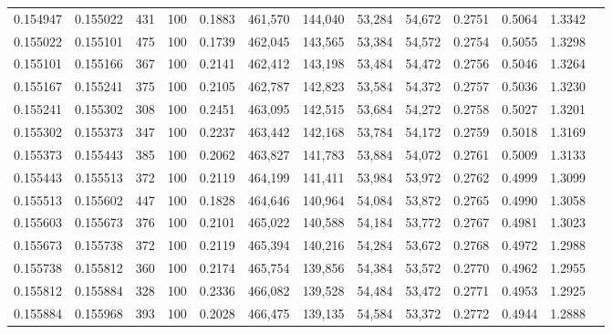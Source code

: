 \begin{tabular}{rrrrrrrrrrrrr}
0.154947 & 0.155022 &   431 & 100 &                                     0.1883 & 461,570 & 144,040 &  53,284 &  54,672 & 0.2751 & 0.5064 & 1.3342 \\
0.155022 & 0.155101 &   475 & 100 &                                     0.1739 & 462,045 & 143,565 &  53,384 &  54,572 & 0.2754 & 0.5055 & 1.3298 \\
0.155101 & 0.155166 &   367 & 100 &                                     0.2141 & 462,412 & 143,198 &  53,484 &  54,472 & 0.2756 & 0.5046 & 1.3264 \\
0.155167 & 0.155241 &   375 & 100 &                                     0.2105 & 462,787 & 142,823 &  53,584 &  54,372 & 0.2757 & 0.5036 & 1.3230 \\
0.155241 & 0.155302 &   308 & 100 &                                     0.2451 & 463,095 & 142,515 &  53,684 &  54,272 & 0.2758 & 0.5027 & 1.3201 \\
0.155302 & 0.155373 &   347 & 100 &                                     0.2237 & 463,442 & 142,168 &  53,784 &  54,172 & 0.2759 & 0.5018 & 1.3169 \\
0.155373 & 0.155443 &   385 & 100 &                                     0.2062 & 463,827 & 141,783 &  53,884 &  54,072 & 0.2761 & 0.5009 & 1.3133 \\
0.155443 & 0.155513 &   372 & 100 &                                     0.2119 & 464,199 & 141,411 &  53,984 &  53,972 & 0.2762 & 0.4999 & 1.3099 \\
0.155513 & 0.155602 &   447 & 100 &                                     0.1828 & 464,646 & 140,964 &  54,084 &  53,872 & 0.2765 & 0.4990 & 1.3058 \\
0.155603 & 0.155673 &   376 & 100 &                                     0.2101 & 465,022 & 140,588 &  54,184 &  53,772 & 0.2767 & 0.4981 & 1.3023 \\
0.155673 & 0.155738 &   372 & 100 &                                     0.2119 & 465,394 & 140,216 &  54,284 &  53,672 & 0.2768 & 0.4972 & 1.2988 \\
0.155738 & 0.155812 &   360 & 100 &                                     0.2174 & 465,754 & 139,856 &  54,384 &  53,572 & 0.2770 & 0.4962 & 1.2955 \\
0.155812 & 0.155884 &   328 & 100 &                                     0.2336 & 466,082 & 139,528 &  54,484 &  53,472 & 0.2771 & 0.4953 & 1.2925 \\
0.155884 & 0.155968 &   393 & 100 &                                     0.2028 & 466,475 & 139,135 &  54,584 &  53,372 & 0.2772 & 0.4944 & 1.2888 \\

\end{tabular}
